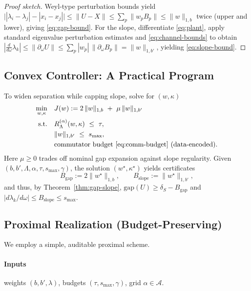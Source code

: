 \documentclass[11pt]{article}
\theoremstyle{definition}
\theoremstyle{remark}
\newcommand{\1}{\mathbf{1}}
\begin{document}
\begin{proof}[Proof sketch]
Weyl-type perturbation bounds yield $\bigl||\lambda_i-\lambda_j|-|x_i-x_j|\bigr|\le 
\|U-X\|\le \sum_p \|w_p B_p\|\le \|w\|_{1,b}$ twice (upper and lower), giving \eqref{eq:gap-bound}.
For the slope, differentiate \eqref{eq:plant}, apply standard eigenvalue
perturbation estimates and \eqref{eq:channel-bounds} to obtain
$|\tfrac{d}{d\omega}\lambda_k|\le \|\partial_\omega U\|
\le \sum_p |w_p|\,\|\partial_\omega B_p\|
=\|w\|_{1,b'}$, yielding \eqref{eq:slope-bound}.
\end{proof}

\subsection{Convex Controller: A Practical Program}
To widen separation while capping slope, solve for $(w,\kappa)$
\begin{equation}
\label{eq:controller}
\begin{aligned}
\min_{w,\kappa}\quad & 
J(w):= 2\,\|w\|_{1,b}\ +\ \mu\,\|w\|_{1,b'}\\
\text{s.t.}\quad & R_{\Lambda}^{(\alpha)}(w,\kappa)\ \le\ \tau,\\
& \|w\|_{1,b'}\ \le\ s_{\max},\\
& \text{commutator budget \eqref{eq:comm-budget} (data-encoded).}
\end{aligned}
\end{equation}
Here $\mu\ge 0$ trades off nominal gap expansion against slope regularity. 
Given $(b,b',\Lambda,\alpha,\tau,s_{\max},\gamma)$, the solution $(w^\star,\kappa^\star)$ yields
certificates
\[
B_{\mathrm{gap}}:=2\|w^\star\|_{1,b},\qquad B_{\mathrm{slope}}:=\|w^\star\|_{1,b'},
\]
and thus, by Theorem~\ref{thm:gap-slope}, 
$\mathrm{gap}(U)\ge \delta_S-B_{\mathrm{gap}}$ and 
$|d\lambda_k/d\omega|\le B_{\mathrm{slope}}\le s_{\max}$.

\subsection{Proximal Realization (Budget-Preserving)}
\label{subsec:prox}
We employ a simple, auditable proximal scheme.

\paragraph{Inputs} weights $(b,b',\lambda)$, budgets $(\tau,s_{\max},\gamma)$, grid $\alpha\in\mathcal A$.
\end{document}
